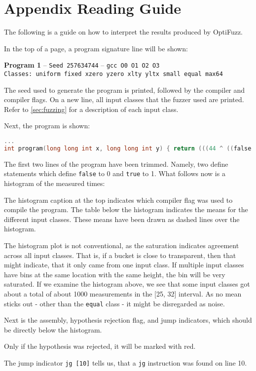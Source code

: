 \section*{Appendix Reading Guide}
The following is a guide on how to interpret the results produced by OptiFuzz. 

In the top of a page, a program signature line will be shown:
\begin{center}
    \textbf{Program 1} -- \texttt{Seed 257634744} -- \texttt{gcc O0 O1 O2 O3}\\\small\texttt{Classes: uniform fixed xzero yzero xlty yltx small equal max64}\\[2mm]
\end{center}
The seed used to generate the program is printed, followed by the compiler and compiler flags.
On a new line, all input classes that the fuzzer used are printed.
Refer to \ref{sec:fuzzing} for a description of each input class.

Next, the program is shown:
\begin{lstlisting}[style=defstyle,language=C]
...
int program(long long int x, long long int y) { return (((44 ^ ((false >> (-874552120269441001 == x)) | ((53 * 29) >= (-5509653365268467218 ^ x)))) * 24) & (false + x)); }
\end{lstlisting}
The first two lines of the program have been trimmed. Namely, two define statements
which define \texttt{false} to 0 and \texttt{true} to 1.
What follows now is a histogram of the measured times:

The histogram caption at the top indicates which compiler flag was used to compile the program.
The table below the histogram indicates the means for the different input classes.
These means have been drawn as dashed lines over the histogram.

The histogram plot is not conventional, as the saturation indicates agreement across all input classes.
That is, if a bucket is close to transparent, then that might indicate, that it only came from one input class.
If multiple input classes have bins at the same location with the same height, the bin will be very saturated. 
If we examine the histogram above, we see that some input classes got about a total of about 1000 measurements in the [25, 32] interval.
As no mean sticks out - other than the \texttt{equal} class - it might be disregarded as noise.

Next is the assembly, hypothesis rejection flag, and jump indicators, which should be directly below the histogram.

Only if the hypothesis was rejected, it will be marked with red.

The jump indicator \texttt{jg [10]} tells us, that a \texttt{jg} instruction was found on line 10.

\newpage
